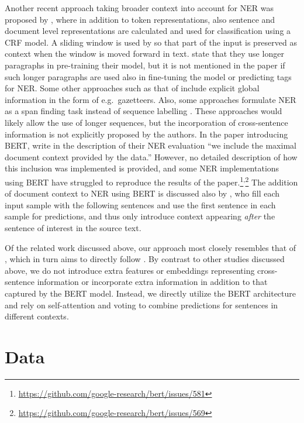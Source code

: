 Another recent approach taking broader context into account for NER was proposed by , where in addition to token representations, also sentence and document level representations are calculated and used for classification using a CRF model. A sliding window is used by  so that part of the input is preserved as context when the window is moved forward in text. 
 state that they use longer paragraphs in pre-training their model, but it is not mentioned in the paper if such longer paragraphs are used also in fine-tuning the model or predicting tags for NER.
Some other approaches such as that of  include explicit global information in the form of e.g.\ gazetteers. Also, some approaches formulate NER as a span finding task instead of sequence labelling \cite{banerjee2019knowledge,li-etal-2020-unified}. These approaches would likely allow the use of longer sequences, but the incorporation of cross-sentence information is not explicitly proposed by the authors. In the paper introducing BERT,  write in the description of their NER evaluation ``we include the maximal document context provided by the data.'' However, no detailed description of how this inclusion was implemented is provided, and some NER implementations using BERT have struggled to reproduce the results of the paper.\footnote{\url{https://github.com/google-research/bert/issues/581}}\textsuperscript{,}\footnote{\url{ https://github.com/google-research/bert/issues/569}} 
The addition of document context to NER using BERT is discussed also by , who fill each input sample with the following sentences and use the first sentence in each sample for predictions, and thus only introduce context appearing \emph{after} the sentence of interest in the source text.

Of the related work discussed above, our approach most closely resembles that of , which in turn aims to directly follow .
By contrast to other studies discussed above, we do not introduce extra features or embeddings representing cross-sentence information or incorporate extra information in addition to that captured by the BERT model. Instead, we directly utilize the BERT architecture and rely on self-attention and voting to combine predictions for sentences in different contexts. 

\section{Data}

